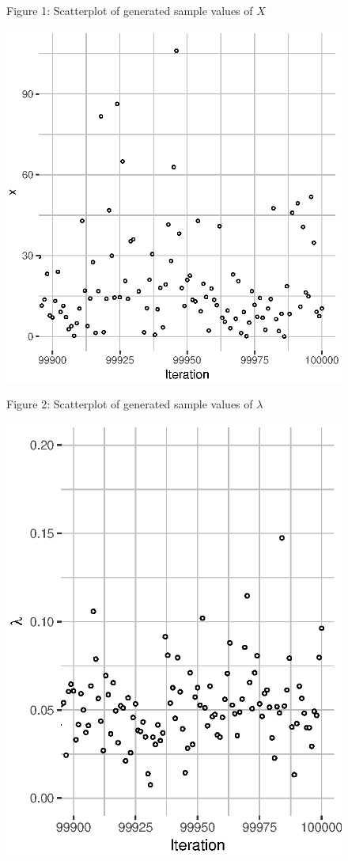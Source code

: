 \documentclass[11pt, oneside]{article}
\newcommand*{\figuretitle}[1]{
    {\centering
    \tiny{#1}
    \par\medskip}
}
\begin{document}
\begin{figure}[h]
   \begin{minipage}{0.45\textwidth}
      \figuretitle{Figure 1: Scatterplot of generated sample values of $X$}
      \centering\includegraphics[scale=0.35]{Figure1}
    \end{minipage}
    \begin{minipage}{0.45\textwidth}
        \figuretitle{Figure 2: Scatterplot of generated sample values of $\lambda$}
        \centering\includegraphics[scale=0.35]{Figure2}

\end{minipage}
\end{figure}
\end{document}
